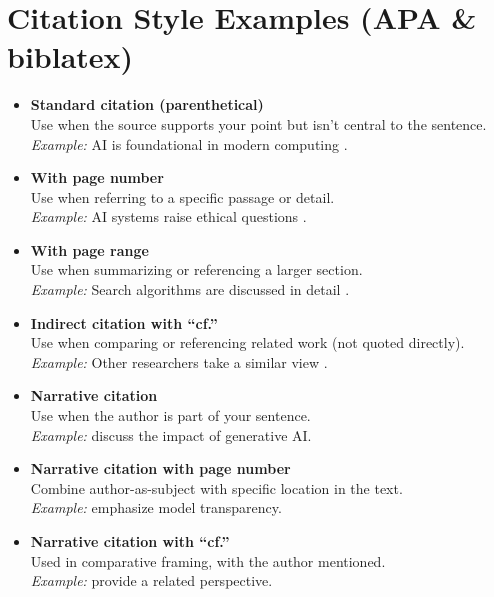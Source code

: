 \documentclass[12pt,a4paper]{article}
\numberwithin{table}{section}
\numberwithin{figure}{section}
\begin{document}
\section*{Citation Style Examples (APA \& biblatex)}
\begin{itemize}
  \item \textbf{Standard citation (parenthetical)} \\
  Use when the source supports your point but isn't central to the sentence.\\
  \textit{Example:} AI is foundational in modern computing \parencite{russell_artificial_2010}.

  \item \textbf{With page number} \\
  Use when referring to a specific passage or detail.\\
  \textit{Example:} AI systems raise ethical questions \parencite[p.~45]{russell_artificial_2010}.

  \item \textbf{With page range} \\
  Use when summarizing or referencing a larger section.\\
  \textit{Example:} Search algorithms are discussed in detail \parencite[pp.~15--24]{russell_artificial_2010}.

  \item \textbf{Indirect citation with ``cf.''} \\
  Use when comparing or referencing related work (not quoted directly).\\
  \textit{Example:} Other researchers take a similar view \parencite[cf.][p.~112]{feuerriegel_generative_2024}.

  \item \textbf{Narrative citation} \\
  Use when the author is part of your sentence.\\
  \textit{Example:} \textcite{feuerriegel_generative_2024} discuss the impact of generative AI.

  \item \textbf{Narrative citation with page number} \\
  Combine author-as-subject with specific location in the text.\\
  \textit{Example:} \textcite[p.~112]{feuerriegel_generative_2024} emphasize model transparency.

  \item \textbf{Narrative citation with ``cf.''} \\
  Used in comparative framing, with the author mentioned.\\
  \textit{Example:} \textcite[cf.][p.~112]{feuerriegel_generative_2024} provide a related perspective.


\end{itemize}
\end{document}
